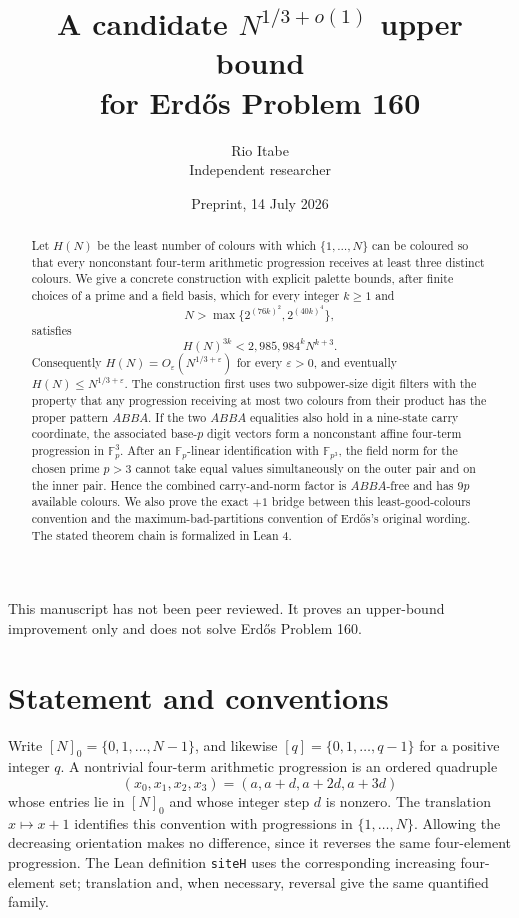 \documentclass[11pt]{article}
\title{A candidate \(N^{1/3+o(1)}\) upper bound\\
for Erd\H{o}s Problem 160}
\author{Rio Itabe\\\small Independent researcher}
\date{Preprint, 14 July 2026}
\theoremstyle{definition}
\newcommand{\F}{\mathbb F}
\newcommand{\siteH}{H}
\begin{document}
\maketitle

\begin{center}
\small This manuscript has not been peer reviewed.  It proves an upper-bound
improvement only and does not solve Erd\H{o}s Problem 160.
\end{center}

\begin{abstract}
Let \(\siteH(N)\) be the least number of colours with which
\(\{1,\ldots,N\}\) can be coloured so that every nonconstant four-term
arithmetic progression receives at least three distinct colours.  We give a
concrete construction with explicit palette bounds, after finite choices of a
prime and a field basis, which for every integer \(k\geq1\) and
\[
 N>\max\bigl\{2^{(76k)^2},2^{(40k)^4}\bigr\},
\]
satisfies
\[
 \siteH(N)^{3k}<2{,}985{,}984^kN^{k+3}.
\]
Consequently \(\siteH(N)=O_\varepsilon(N^{1/3+\varepsilon})\) for every
\(\varepsilon>0\), and eventually
\(\siteH(N)\leq N^{1/3+\varepsilon}\).  The construction first uses two
subpower-size digit filters with the property that any progression receiving
at most two colours from their product has the proper pattern \(ABBA\).  If
the two \(ABBA\) equalities also hold in a nine-state carry coordinate, the
associated base-\(p\) digit vectors form a nonconstant affine four-term
progression in \(\F_p^3\).  After an \(\F_p\)-linear identification with
\(\F_{p^3}\), the field norm for the chosen prime \(p>3\) cannot take equal
values simultaneously on the outer pair and on the inner pair.  Hence the
combined carry-and-norm factor is \(ABBA\)-free and has \(9p\) available
colours.  We also prove the exact \(+1\) bridge between this
least-good-colours convention and the
maximum-bad-partitions convention of Erd\H{o}s's original wording.  The stated
theorem chain is formalized in Lean 4.
\end{abstract}

\section{Statement and conventions}

Write \([N]_0=\{0,1,\ldots,N-1\}\), and likewise
\([q]=\{0,1,\ldots,q-1\}\) for a positive integer \(q\).  A nontrivial four-term arithmetic
progression is an ordered quadruple
\[
 (x_0,x_1,x_2,x_3)=(a,a+d,a+2d,a+3d)
 \tag{1.1}
\]
whose entries lie in \([N]_0\) and whose integer step \(d\) is nonzero.  The
translation \(x\mapsto x+1\) identifies this convention with progressions in
\(\{1,\ldots,N\}\).  Allowing the decreasing orientation makes no difference,
since it reverses the same four-element progression.  The Lean definition
\texttt{siteH} uses the corresponding increasing four-element set; translation
and, when necessary, reversal give the same quantified family.
\end{document}
